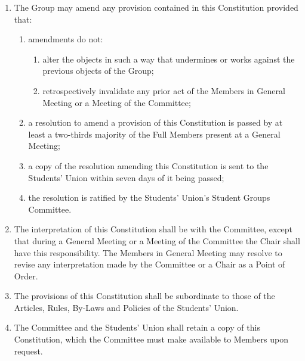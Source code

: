 \documentclass[12pt]{constitution}
\begin{document}
\begin{enumerate}
    \item The Group may amend any provision contained in this Constitution provided that:
    \begin{enumerate}
        \item amendments do not:
        \begin{enumerate}
            \item alter the objects in such a way that undermines or works against the previous objects of the Group;
            \item retrospectively invalidate any prior act of the Members in General Meeting or a Meeting of the Committee;
        \end{enumerate}

        \item a resolution to amend a provision of this Constitution is passed by at least a two-thirds majority of the Full Members present at a General Meeting;
        \item a copy of the resolution amending this Constitution is sent to the Students' Union within seven days of it being passed;
        \item the resolution is ratified by the Students' Union's Student Groups Committee.
    \end{enumerate}

    \item The interpretation of this Constitution shall be with the Committee, except that during a General Meeting or a Meeting of the Committee the Chair shall have this responsibility.  The Members in General Meeting may resolve to revise any interpretation made by the Committee or a Chair as a Point of Order.
    \item The provisions of this Constitution shall be subordinate to those of the Articles, Rules, By-Laws and Policies of the Students' Union.
    \item The Committee and the Students' Union shall retain a copy of this Constitution, which the Committee must make available to Members upon request.
\end{enumerate}


\end{document}
